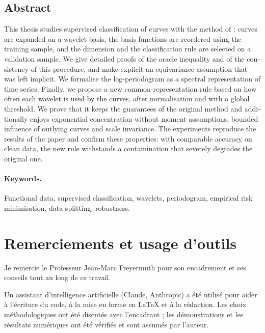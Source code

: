 \begin{otherlanguage}{english}
\section*{Abstract}

This thesis studies supervised classification of curves with the method of \citet{berlinet2008functional}: curves are expanded on a wavelet basis, the basis functions are reordered using the training sample, and the dimension and the classification rule are selected on a validation sample. We give detailed proofs of the oracle inequality and of the consistency of this procedure, and make explicit an equivariance assumption that was left implicit. We formalise the log-periodogram as a spectral representation of time series. Finally, we propose a new common-representation rule based on how often each wavelet is used by the curves, after normalisation and with a global threshold. We prove that it keeps the guarantees of the original method and additionally enjoys exponential concentration without moment assumptions, bounded influence of outlying curves and scale invariance. The experiments reproduce the results of the paper and confirm these properties: with comparable accuracy on clean data, the new rule withstands a contamination that severely degrades the original one.

\paragraph{Keywords.} Functional data, supervised classification, wavelets, periodogram, empirical risk minimisation, data splitting, robustness.
\end{otherlanguage}

\vspace{1cm}

\section*{Remerciements et usage d'outils}

Je remercie le Professeur Jean-Marc Freyermuth pour son encadrement et ses conseils tout au long de ce travail.

\noindent Un assistant d'intelligence artificielle (Claude, Anthropic) a été utilisé pour aider à l'écriture du code, à la mise en forme en \LaTeX{} et à la rédaction. Les choix méthodologiques ont été discutés avec l'encadrant ; les démonstrations et les résultats numériques ont été vérifiés et sont assumés par l'auteur.

\cleardoublepage
